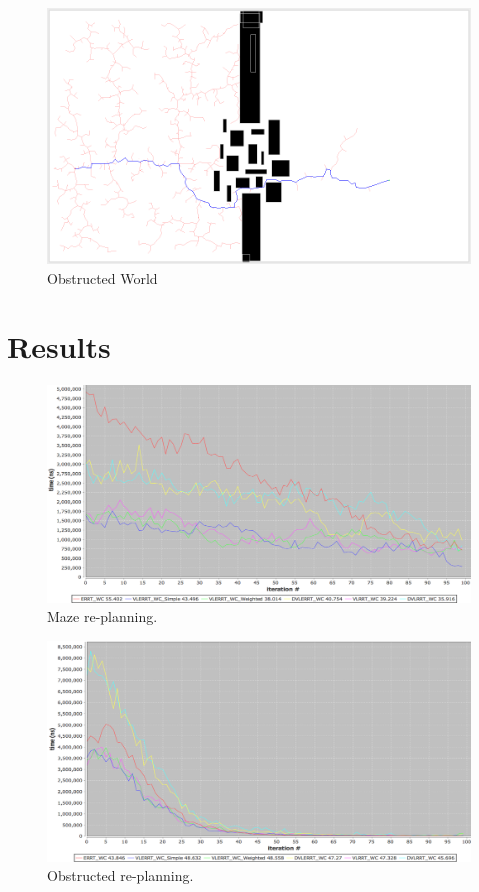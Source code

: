 \documentclass[10pt,twoside,twocolumn]{article}
\begin{document}
\begin{figure}[h]
\begin{center}
\includegraphics[scale=0.2]{prop_world.png}
\end{center}
\caption{Obstructed World}
\end{figure}

\section{Results}

\begin{figure}[h]
\begin{center}
\includegraphics[scale=0.15]{maze_wc.png}
\end{center}
\caption{Maze re-planning.}
\label{replanning_maze}
\end{figure}


\begin{figure}[h]
\begin{center}
\includegraphics[scale=0.15]{obstructed_wc.png}
\end{center}
\caption{Obstructed re-planning.}
\label{replanning_obstructed}
\end{figure}
\end{document}
